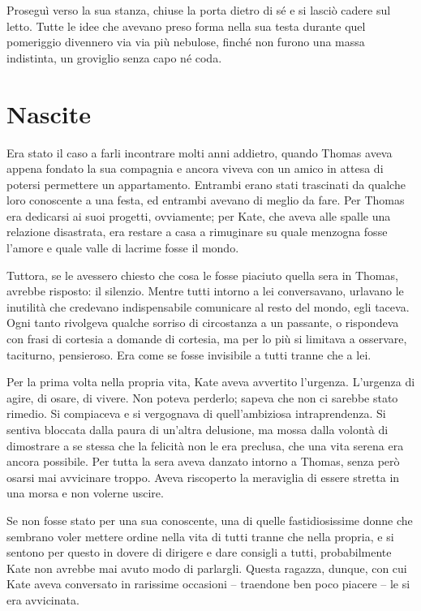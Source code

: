 \documentclass[a4paper,oneside,11pt]{memoir}
\begin{document}
Proseguì verso la sua stanza, chiuse la porta dietro di sé e si lasciò cadere
sul letto. Tutte le idee che avevano preso forma nella sua testa durante quel
pomeriggio divennero via via più nebulose, finché non furono una massa
indistinta, un groviglio senza capo né coda.

\chapter{Nascite}

Era stato il caso a farli incontrare molti anni addietro, quando Thomas aveva
appena fondato la sua compagnia e ancora viveva con un amico in attesa di
potersi permettere un appartamento. Entrambi erano stati trascinati da qualche
loro conoscente a una festa, ed entrambi avevano di meglio da fare. Per Thomas
era dedicarsi ai suoi progetti, ovviamente; per Kate, che aveva alle spalle una
relazione disastrata, era restare a casa a rimuginare su quale menzogna fosse
l'amore e quale valle di lacrime fosse il mondo.

Tuttora, se le avessero chiesto che cosa le fosse piaciuto quella sera in
Thomas, avrebbe risposto: il silenzio. Mentre tutti intorno a lei conversavano,
urlavano le inutilità che credevano indispensabile comunicare al resto del
mondo, egli taceva. Ogni tanto rivolgeva qualche sorriso di circostanza a un
passante, o rispondeva con frasi di cortesia a domande di cortesia, ma per lo
più si limitava a osservare, taciturno, pensieroso. Era come se fosse invisibile
a tutti tranne che a lei.

Per la prima volta nella propria vita, Kate aveva avvertito l'urgenza. L'urgenza
di agire, di osare, di vivere. Non poteva perderlo; sapeva che non ci sarebbe
stato rimedio. Si compiaceva e si vergognava di quell'ambiziosa intraprendenza.
Si sentiva bloccata dalla paura di un'altra delusione, ma mossa dalla volontà di
dimostrare a se stessa che la felicità non le era preclusa, che una vita serena
era ancora possibile. Per tutta la sera aveva danzato intorno a Thomas, senza
però osarsi mai avvicinare troppo. Aveva riscoperto la meraviglia di essere
stretta in una morsa e non volerne uscire.

Se non fosse stato per una sua conoscente, una di quelle fastidiosissime donne
che sembrano voler mettere ordine nella vita di tutti tranne che nella propria,
e si sentono per questo in dovere di dirigere e dare consigli a tutti,
probabilmente Kate non avrebbe mai avuto modo di parlargli. Questa ragazza,
dunque, con cui Kate aveva conversato in rarissime occasioni -- traendone ben
poco piacere -- le si era avvicinata.
\end{document}
